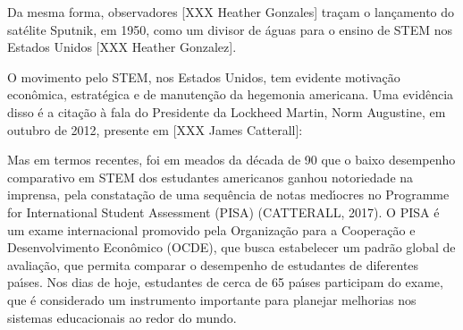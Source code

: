 \documentclass[
12pt,		%
openright,	%
twoside,  %
a4paper,			%
chapter=TITLE,		%
english,			%
french,				%
spanish,			%
brazil				%
]{USPSC-classe/USPSC}
\begin{document}
\noindent\begin{center}\mbox{\centering{}}\end{center}


Da mesma forma, observadores [XXX Heather Gonzales] tra\c{c}am o lan\c{c}amento do sat\'elite Sputnik, em 1950, como um divisor de \'aguas para o ensino de STEM nos Estados Unidos [XXX Heather Gonzalez].




O movimento pelo STEM, nos Estados Unidos, tem evidente motiva\c{c}\~ao econ\^omica, estrat\'egica e de manuten\c{c}\~ao da hegemonia americana. Uma evid\^encia disso \'e a cita\c{c}\~ao \`a fala do Presidente da Lockheed Martin, Norm Augustine, em outubro de 2012, presente em [XXX James Catterall]:





\noindent\begin{center}\mbox{\centering{}}\end{center}


Mas em termos recentes, foi em meados da d\'ecada de 90 que o baixo desempenho comparativo em STEM dos estudantes americanos ganhou notoriedade na imprensa, pela constata\c{c}\~ao de uma sequ\^encia de notas med\'{\i}ocres no Programme for International Student Assessment (PISA)  (CATTERALL, 2017). O PISA \'e um exame internacional promovido pela Organiza\c{c}\~ao para a Coopera\c{c}\~ao e Desenvolvimento Econ\^omico (OCDE), que busca estabelecer um padr\~ao global de avalia\c{c}\~ao, que permita comparar o desempenho de estudantes de diferentes pa\'{\i}ses. Nos dias de hoje, estudantes de cerca de 65 pa\'{\i}ses participam do exame, que \'e considerado um instrumento importante para planejar melhorias nos sistemas educacionais ao redor do mundo.
\end{document}
